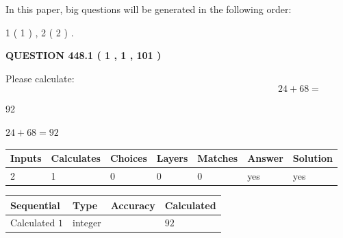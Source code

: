 \documentclass[12pt]{article}
\begin{document}
In this paper, big questions will be generated in the following order: 
   
   
   1 ( 1 )
 ,
   2 ( 2 )
 .
  
\vspace{0.2in}
  
{\textbf{\Large{QUESTION
448.1 
 ( 1 , 1 , 101 )
}}}
  
  
 
Please calculate:
\begin{equation}
24 +  %
68 = \nonumber
\end{equation}
 
 
 
\noindent{}
 
 

92
 
 
\noindent{}
 
 

 
 
 
\noindent{}
 
 

$ %
24 +  %
68=   %
92$
 
 
\noindent{}
 
 

 
   
   
   
   
\noindent\begin{tabular}{|l|l|l|l|l|l|l|}
 \hline
Inputs & Calculates & Choices & Layers & Matches & Answer & Solution \\ \hline
 2  & 
 1  & 
 0
  & 
 0  & 
 0  & 
  yes & 
  yes 
  \\ \hline
 \end{tabular}
   
   
   
   
\noindent{}
   
   
  
  
\noindent\begin{tabular}{|l|l|l|l|}
\hline
 Sequential & Type & Accuracy & Calculated \\ 
\hline
 
 
  Calculated $  1 $ & integer &  & 
  $ 92 $ 
 \\  \hline  
 \end{tabular}
   
\end{document}
